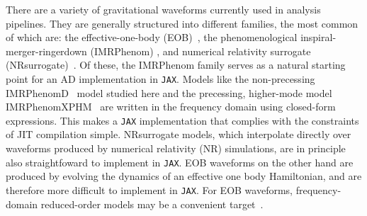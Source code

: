 \documentclass[twocolumn]{aastex631}
\newcommand{\jax}{\texttt{JAX}\xspace}
\newcommand{\te}[1]{\textbf{\color{pyGreen}(TE: #1)}}
\newcommand{\AZ}[1]{{\color{Burnt}[AZ: #1]}}
\begin{document}
There are a variety of gravitational waveforms currently used in analysis pipelines.
They are generally structured into different families, the most common of which are: the effective-one-body (EOB)~\citep{Damour:2008yg,Buonanno:2005xu, Buonanno:2000ef, Buonanno:1998gg, Damour:2000we,Ossokine:2020kjp,Nagar:2021gss,Ramos-Buades:2021adz,Albertini:2021tbt, Cotesta:2020qhw, Bohe:2016gbl}, the phenomenological inspiral-merger-ringerdown (IMRPhenom) \citep{Husa:2015iqa,Khan:2015jqa,Hannam:2013oca,Pratten:2020ceb, Smith:2016qas, Pratten:2020fqn, Garcia-Quiros:2020qpx}, and numerical relativity surrogate (NRsurrogate)~\citep{Blackman:2017pcm,Varma:2018mmi,Varma:2019csw}.
Of these, the IMRPhenom family serves as a natural starting point for an AD implementation in \jax.
Models like the non-precessing IMRPhenomD~\citep{Khan:2015jqa} model studied here and the precessing, higher-mode model IMRPhenomXPHM~\citep{Pratten:2020fqn, Pratten:2020ceb} are written in the frequency domain using closed-form expressions.
This makes a
\jax implementation that complies with the constraints of JIT compilation simple.
NRsurrogate models, which interpolate directly over waveforms produced by numerical relativity (NR) simulations, are in principle also straightfoward to implement in \jax.
EOB waveforms on the other hand are produced by evolving the dynamics of an effective one body Hamiltonian, and are therefore more difficult to implement in \jax.
For EOB waveforms, frequency-domain reduced-order models may be a convenient target~\citep[e.g.]{Cotesta:2020qhw}.
\end{document}
